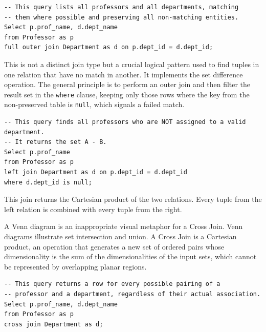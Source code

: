 \begin{description}
    \begin{verbatim}
-- This query lists all professors and all departments, matching
-- them where possible and preserving all non-matching entities.
Select p.prof_name, d.dept_name
from Professor as p
full outer join Department as d on p.dept_id = d.dept_id;
    \end{verbatim}

     \item[Excluding Join (Anti-Join)] This is not a distinct join type but a crucial logical pattern used to find tuples in one relation that have no match in another. It implements the set difference operation. The general principle is to perform an outer join and then filter the result set in the \texttt{where} clause, keeping only those rows where the key from the non-preserved table is \texttt{null}, which signals a failed match.

    \begin{center}
    \end{center}

    \begin{verbatim}
-- This query finds all professors who are NOT assigned to a valid department.
-- It returns the set A - B.
Select p.prof_name
from Professor as p
left join Department as d on p.dept_id = d.dept_id
where d.dept_id is null;
    \end{verbatim}

    \item[Cross Join] This join returns the Cartesian product of the two relations. Every tuple from the left relation is combined with every tuple from the right.
    
    \begin{remark}
    A Venn diagram is an inappropriate visual metaphor for a Cross Join. Venn diagrams illustrate set intersection and union. A Cross Join is a Cartesian product, an operation that generates a new set of ordered pairs whose dimensionality is the sum of the dimensionalities of the input sets, which cannot be represented by overlapping planar regions.
    \end{remark}

    \begin{verbatim}
-- This query returns a row for every possible pairing of a
-- professor and a department, regardless of their actual association.
Select p.prof_name, d.dept_name
from Professor as p
cross join Department as d;
    \end{verbatim}
\end{description}

